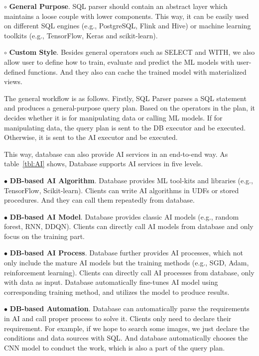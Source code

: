 $\circ$ \textbf{General Purpose}. SQL parser should contain an abstract layer which maintains a loose couple with lower components. This way, it can be easily used on different SQL engines (e.g., PostgreSQL, Flink and Hive) or machine learning toolkits (e.g., TensorFlow, Keras and scikit-learn). 

$\circ$ \textbf{Custom Style}. Besides general operators such as SELECT and WITH, we also allow user to define how to train, evaluate and predict the ML models with user-defined functions. And they also can cache the trained model with materialized views.

The general workflow is as follows. Firstly, SQL Parser parses a SQL statement and produces a general-purpose query plan. Based on the operators in the plan, it decides whether it is for manipulating data or calling ML models. If for manipulating data, the query plan is sent to the DB executor and be executed. Otherwise, it is sent to the AI executor and be executed.

This way, database can also provide AI services in an end-to-end way. As table~\ref{tbl:AI} shows, Database supports AI services in five levels.

$\bullet$ \textbf{DB-based AI Algorithm}. Database provides ML tool-kits and libraries (e.g., TensorFlow, Scikit-learn). Clients can write AI algorithms in UDFs or stored procedures. And they can call them repeatedly from database. 

$\bullet$ \textbf{DB-based AI Model}. Database provides classic AI models (e.g., random forest, RNN, DDQN). Clients can directly call AI models from database and only focus on the training part. 

$\bullet$ \textbf{DB-based AI Process}. Database further provides AI processes, which not only include the mature AI models but the training methods (e.g., SGD, Adam, reinforcement learning). Clients can directly call AI processes from database, only with data as input. Database automatically fine-tunes AI model using corresponding training method, and utilizes the model to produce results. 

$\bullet$ \textbf{DB-based Automation}. Database can automatically parse the requirements in AI and call proper process to solve it. Clients only need to declare their requirement. For example, if we hope to search some images, we just declare the conditions and data sources with SQL. And database automatically chooses the CNN model to conduct the work, which is also a part of the query plan.

